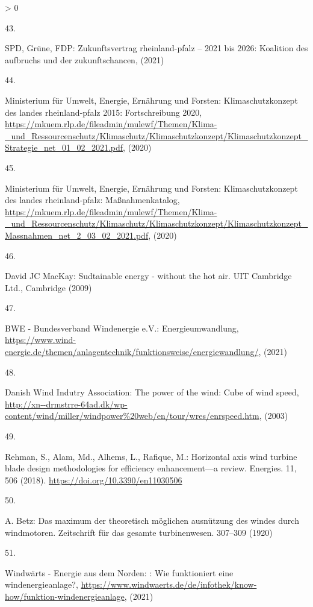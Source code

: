 \documentclass[a4paper,11pt]{article}
\newlength{\cslhangindent}
\newlength{\csllabelwidth}
\newenvironment{CSLReferences}[3] %
 {%
  \setlength{\parindent}{0pt}
  \ifodd #1 \everypar{\setlength{\hangindent}{\cslhangindent}}\ignorespaces\fi
  \ifnum #2 > 0
  \setlength{\parskip}{#2\baselineskip}
  \fi
 }%
 {}
\newcommand{\CSLLeftMargin}[1]{\parbox[t]{\maxof{\widthof{#1}}{\csllabelwidth}}{#1}}
\newcommand{\CSLRightInline}[1]{\parbox[t]{\linewidth}{#1}}
\begin{document}
\begin{CSLReferences}{0}{0}
\leavevmode\hypertarget{ref-SPD.2021}{}%
\CSLLeftMargin{43. }
\CSLRightInline{SPD, Grüne, FDP: Zukunftsvertrag rheinland-pfalz -- 2021 bis 2026: Koalition des aufbruchs und der zukunftschancen, (2021)}

\leavevmode\hypertarget{ref-MinisteriumfurUmweltEnergieErnahrungundForsten.2020b}{}%
\CSLLeftMargin{44. }
\CSLRightInline{Ministerium für Umwelt, Energie, Ernährung und Forsten: Klimaschutzkonzept des landes rheinland-pfalz 2015: Fortschreibung 2020, \url{https://mkuem.rlp.de/fileadmin/mulewf/Themen/Klima-_und_Ressourcenschutz/Klimaschutz/Klimaschutzkonzept/Klimaschutzkonzept_Strategie_net_01_02_2021.pdf}, (2020)}

\leavevmode\hypertarget{ref-MinisteriumfurUmweltEnergieErnahrungundForsten.2020}{}%
\CSLLeftMargin{45. }
\CSLRightInline{Ministerium für Umwelt, Energie, Ernährung und Forsten: Klimaschutzkonzept des landes rheinland-pfalz: Ma{ß}nahmenkatalog, \url{https://mkuem.rlp.de/fileadmin/mulewf/Themen/Klima-_und_Ressourcenschutz/Klimaschutz/Klimaschutzkonzept/Klimaschutzkonzept_Massnahmen_net_2_03_02_2021.pdf}, (2020)}

\leavevmode\hypertarget{ref-DavidJCMacKay.2009}{}%
\CSLLeftMargin{46. }
\CSLRightInline{David JC MacKay: Sudtainable energy - without the hot air. {UIT Cambridge Ltd.}, Cambridge (2009)}

\leavevmode\hypertarget{ref-BWE.2021}{}%
\CSLLeftMargin{47. }
\CSLRightInline{BWE - Bundesverband Windenergie e.V.: Energieumwandlung, \url{https://www.wind-energie.de/themen/anlagentechnik/funktionsweise/energiewandlung/}, (2021)}

\leavevmode\hypertarget{ref-DanishWindIndutryAssociation.2003}{}%
\CSLLeftMargin{48. }
\CSLRightInline{Danish Wind Indutry Association: The power of the wind: Cube of wind speed, \url{http://xn--drmstrre-64ad.dk/wp-content/wind/miller/windpower\%20web/en/tour/wres/enrspeed.htm}, (2003)}

\leavevmode\hypertarget{ref-Rehman.2018}{}%
\CSLLeftMargin{49. }
\CSLRightInline{Rehman, S., Alam, Md., Alhems, L., Rafique, M.: Horizontal axis wind turbine blade design methodologies for efficiency enhancement---a review. Energies. 11, 506 (2018). \url{https://doi.org/10.3390/en11030506}}

\leavevmode\hypertarget{ref-A.Betz.1920}{}%
\CSLLeftMargin{50. }
\CSLRightInline{A. Betz: Das maximum der theoretisch m{ö}glichen ausn{ü}tzung des windes durch windmotoren. Zeitschrift f{ü}r das gesamte turbinenwesen. 307--309 (1920)}

\leavevmode\hypertarget{ref-WindwartsEnergieausdemNorden.2021}{}%
\CSLLeftMargin{51. }
\CSLRightInline{Windwärts - Energie aus dem Norden: : Wie funktioniert eine windenergieanlage?, \url{https://www.windwaerts.de/de/infothek/know-how/funktion-windenergieanlage}, (2021)}


\end{CSLReferences}
\end{document}
